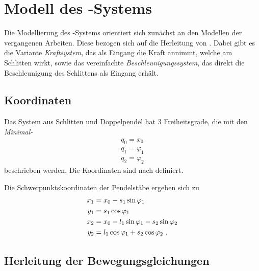 \section{Modell des \spd-Systems}\label{sec:spdModell}


Die Modellierung des \spd-Systems orientiert sich zunächst an den Modellen der vergangenen Arbeiten. 
Diese bezogen sich auf die Herleitung von \cite{modpen}. 
Dabei gibt es die Variante \emph{Kraftsystem}, das als Eingang die Kraft annimmt, welche am Schlitten wirkt, sowie das vereinfachte \emph{Beschleunigungssystem}, das direkt die Beschleunigung des Schlittens als Eingang erhält.



\begin{figure}[h]
	\centering
		
			\caption{\dpd}
	 \label{fig:koord}
\end{figure}

\subsection{Koordinaten}

Das System aus Schlitten und Doppelpendel hat 3 Freiheitsgrade, die mit den \emph{Minimal-\koor} 
\begin{align*}
	q_0 = x_0  \\
	q_1 = \varphi_1  \\
	q_2 = \varphi_2
\end{align*}
beschrieben werden. Die Koordinaten sind nach  definiert.

Die Schwerpunktskoordinaten der Pendelstäbe ergeben sich zu
\begin{align*}
	x_1 &= x_0 - s_1 \sin{\ensuremath{\varphi_1}}  \\
	y_1 &=       s_1 \cos{\ensuremath{\varphi_1}}  \\
	x_2 &= x_0 - l_1 \sin{\ensuremath{\varphi_1}} - s_2 \sin{\ensuremath{\varphi_2}}  \\
	y_2 &=       l_1 \cos{\ensuremath{\varphi_1}} + s_2 \cos{\ensuremath{\varphi_2}}  \ .
\end{align*}


\subsection{Herleitung der Bewegungsgleichungen}\label{subsec:bwgl}

